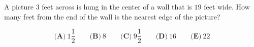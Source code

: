 

A picture $ 3$ feet across is hung in the center of a wall that is $ 19$ feet wide. How many feet from the end of the wall is the nearest edge of the picture?

\[ \textbf{(A)}\ 1 \frac{1}{2} \qquad
\textbf{(B)}\ 8 \qquad
\textbf{(C)}\ 9 \frac{1}{2} \qquad
\textbf{(D)}\ 16 \qquad
\textbf{(E)}\ 22
\]
